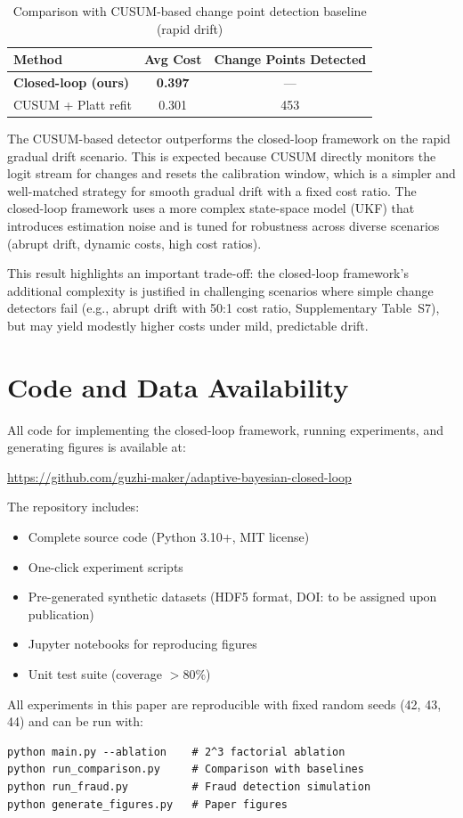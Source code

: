 \documentclass[12pt,a4paper]{article}
\begin{document}
\begin{table}[h]
\centering
\caption{Comparison with CUSUM-based change point detection baseline (rapid drift)}
\label{tab:bocpd}
\begin{tabular}{lcc}
\toprule
Method & Avg Cost & Change Points Detected \\
\midrule
\textbf{Closed-loop (ours)} & \textbf{0.397} & --- \\
CUSUM + Platt refit & 0.301 & 453 \\
\bottomrule
\end{tabular}
\end{table}

The CUSUM-based detector outperforms the closed-loop framework on the rapid gradual drift 
scenario. This is expected because CUSUM directly monitors the logit stream for changes 
and resets the calibration window, which is a simpler and well-matched strategy for 
smooth gradual drift with a fixed cost ratio. The closed-loop framework uses a more 
complex state-space model (UKF) that introduces estimation noise and is tuned for 
robustness across diverse scenarios (abrupt drift, dynamic costs, high cost ratios).

This result highlights an important trade-off: the closed-loop framework's additional 
complexity is justified in challenging scenarios where simple change detectors fail 
(e.g., abrupt drift with 50:1 cost ratio, Supplementary Table~S7), but may yield 
modestly higher costs under mild, predictable drift.


\section{Code and Data Availability}

All code for implementing the closed-loop framework, running experiments, and generating figures is available at:
\begin{center}
\url{https://github.com/guzhi-maker/adaptive-bayesian-closed-loop}
\end{center}

The repository includes:
\begin{itemize}
    \item Complete source code (Python 3.10+, MIT license)
    \item One-click experiment scripts
    \item Pre-generated synthetic datasets (HDF5 format, DOI: to be assigned upon publication)
    \item Jupyter notebooks for reproducing figures
    \item Unit test suite (coverage $> 80\%$)
\end{itemize}

All experiments in this paper are reproducible with fixed random seeds (42, 43, 44) and can be run with:
\begin{verbatim}
python main.py --ablation    # 2^3 factorial ablation
python run_comparison.py     # Comparison with baselines
python run_fraud.py          # Fraud detection simulation
python generate_figures.py   # Paper figures
\end{verbatim}
\end{document}
